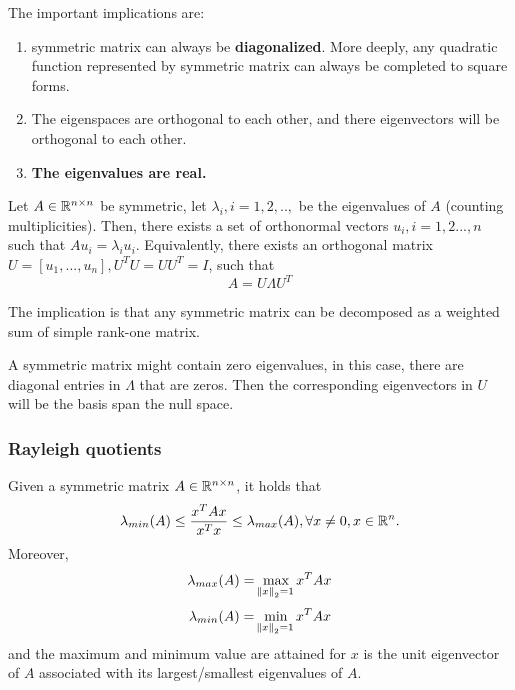 \begin{refsection}
\begin{remark}
The important implications are:
\begin{enumerate}
\item symmetric matrix can always be \textbf{diagonalized}. More deeply, any quadratic function represented by symmetric matrix can always be completed to square forms.
\item The eigenspaces are orthogonal to each other, and there eigenvectors will be orthogonal to each other. 
\item \textbf{The eigenvalues are real.}
\end{enumerate}
\end{remark}





\begin{theorem}
\cite{calafiore2014optimization}Let $A\in \mathbb{R}^{n\times n}$ be symmetric, let $\lambda_i,i=1,2,..,$ be the eigenvalues of $A$ (counting multiplicities). Then, there exists a set of orthonormal vectors $u_i,i=1,2...,n$ such that $Au_i = \lambda_i u_i$. Equivalently, there exists an orthogonal matrix $U=[u_1,...,u_n], U^TU = UU^T = I$, such that 
$$A = U\Lambda U^T$$
\end{theorem}
\begin{remark}
The implication is that any symmetric matrix can be decomposed as a weighted sum of simple rank-one matrix. 
\end{remark}


\begin{remark}
A symmetric matrix might contain zero eigenvalues, in this case, there are diagonal entries in $\Lambda$ that are zeros. Then the corresponding eigenvectors in $U$ will be the basis span the null space. 
\end{remark}




\subsubsection{Rayleigh quotients}

\begin{theorem}\cite[126]{calafiore2014optimization}\cite[235]{horn2012matrix}\label{ch:linearalgebra:th:Raylleighquotient}
	Given a symmetric matrix $A\in \mathbb{R}^{n\times n}$, it holds that 
	$$\lambda_{min}(A)\leq \frac{x^TAx}{x^Tx} \leq \lambda_{max}(A),\forall x\neq 0, x\in \mathbb{R}^n.$$
	Moreover, 
	$$\lambda_{max}(A) = \max_{\norm{x}_2 = 1} x^TAx$$
	$$\lambda_{min}(A) = \min_{\norm{x}_2 = 1} x^TAx$$
	and the maximum and minimum value are attained for $x$ is the unit eigenvector of $A$ associated with its largest/smallest eigenvalues of $A$.
\end{theorem}


\end{refsection}
